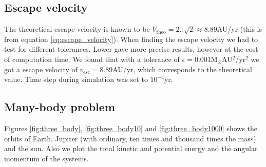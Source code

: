 \documentclass[reprint, english,notitlepage,nofootinbib]{revtex4-1}  %
\begin{document}
\subsection{Escape velocity}

The theoretical escape velocity is known to be $V_{\text{theo}} = 2\pi\sqrt{2} \approx 8.89$AU/yr (this is from equation \eqref{eq:escape_velocity}). When finding the escape velocity we had to test for different tolerances. Lower gave more precise results, however at the cost of computation time. We found that with a tolerance of $\epsilon = 0.001$M$_\odot$AU$^2$/yr$^2$ we got a escape velocity of $v_{\text{esc}} = 8.89$AU/yr, which corresponds to the theoretical value. Time step during simulation was set to $10^{-4}$yr.


\subsection{Many-body problem}

Figures \ref{fig:three_body}, \ref{fig:three_body10} and \ref{fig:three_body1000} shows the orbits of Earth, Jupiter (with ordinary, ten times and thousand times the mass) and the sun. Also we plot the total kinetic and potential energy and the angular momentum of the systems.
\end{document}
